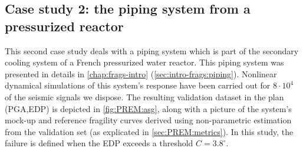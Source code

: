 \subsection{Case study 2: the piping system from a pressurized reactor}


This second case study deals with a piping system which is part of the secondary cooling system of a French pressurized water reactor. This piping system was presented in details in   \cref{chap:frags-intro} (\cref{sec:intro-frags:piping}).
Nonlinear dynamical simulations of this system's response have been carried out for $8\cdot10^4$ of the seismic signals we dispose.
The resulting validation dataset in the plan (PGA,EDP) is depicted in \cref{fig:PREM:asg}, along with a picture of the system's mock-up and reference fragility curves derived using non-parametric estimation from the validation set (as explicated in \cref{sec:PREM:metrics}).
In this study, the failure is defined when the EDP exceeds a threshold $C=3.8^\circ$.





